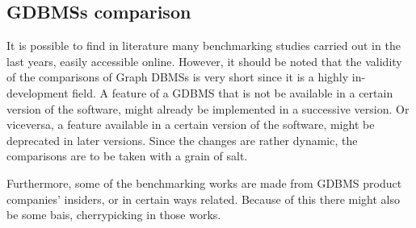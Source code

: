 \subsection{GDBMSs comparison}\label{subsection:LiteratureReview/ReviewofGraphDatabaseSystems/GDBMSscomparison}
It is possible to find in literature many benchmarking studies carried out in the last years, easily accessible online.
However, it should be noted that the validity of the comparisons of Graph DBMSs is very short since it is a highly in-development field.
A feature of a GDBMS that is not be available in a certain version of the software, might already be implemented in a successive version.
Or viceversa, a feature available in a certain version of the software, might be deprecated in later versions.
Since the changes are rather dynamic, the comparisons are to be taken with a grain of salt.

Furthermore, some of the benchmarking works are made from GDBMS product companies' insiders, or in certain ways related.
Because of this there might also be some bais, cherrypicking in those works.


